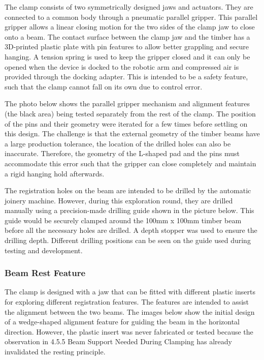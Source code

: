 The clamp consists of two symmetrically designed jaws and actuators. They are connected to a common body through a pneumatic parallel gripper. This parallel gripper allows a linear closing motion for the two sides of the clamp jaw to close onto a beam.
The contact surface between the clamp jaw and the timber has a 3D-printed plastic plate with pin features to allow better grappling and secure hanging. A tension spring is used to keep the gripper closed and it can only be opened when the device is docked to the robotic arm and compressed air is provided through the docking adapter. This is intended to be a safety feature, such that the clamp cannot fall on its own due to control error.

The photo below shows the parallel gripper mechanism and alignment features (the black area) being tested separately from the rest of the clamp. The position of the pins and their geometry were iterated for a few times before settling on this design. The challenge is that the external geometry of the timber beams have a large production tolerance, the location of the drilled holes can also be inaccurate. Therefore, the geometry of the L-shaped pad and the pins must accommodate this error such that the gripper can close completely and maintain a rigid hanging hold afterwards.

The registration holes on the beam are intended to be drilled by the automatic joinery machine. However, during this exploration round, they are drilled manually using a precision-made drilling guide shown in the picture below. This guide would be securely  clamped around the 100mm x 100mm timber beam before all the necessary holes are drilled. A depth stopper was used to ensure the drilling depth. Different drilling positions can be seen on the guide used during testing and development.


\subsubsection{Beam Rest Feature}
\label{subsubsection:exploration_1_beam_rest_feature}

The clamp is designed with a jaw that can be fitted with different plastic inserts for exploring different registration features. The features are intended to assist the alignment between the two beams. The images below show the initial design of a wedge-shaped alignment feature for guiding the beam in the horizontal direction. However, the plastic insert was never fabricated or tested because the observation in 4.5.5 Beam Support Needed During Clamping has already invalidated the resting principle.

